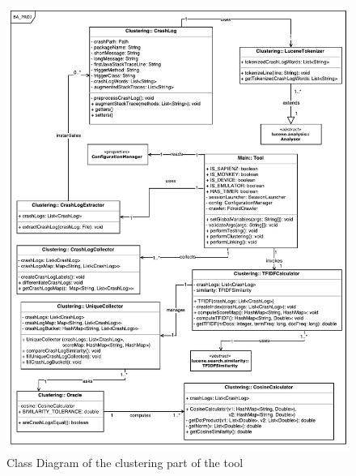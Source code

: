\begin{figure}[t]
\centering 
\includegraphics[width=\columnwidth]{diagrams/clustering.pdf} 
\caption{Class Diagram of the clustering part of the tool }
\label{clustering}
\vspace{-3mm} 
\end{figure}


